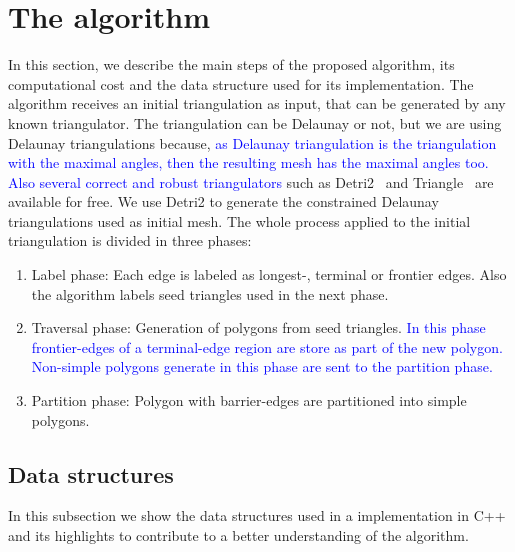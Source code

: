 \documentclass[pdflatex,sn-mathphys]{sn-jnl}%
\theoremstyle{thmstyleone}%
\theoremstyle{thmstyletwo}%
\theoremstyle{thmstylethree}%
\begin{document}
\section{The algorithm}
\label{sec:the_algorithm}


In this section, we describe  the main steps of the proposed algorithm, its computational cost  and the data structure used for its implementation.
The algorithm receives an initial triangulation as input, that can be generated by any known triangulator. The triangulation can be Delaunay or not, but we are using Delaunay triangulations because, \textcolor{blue}{ as Delaunay triangulation is the triangulation with the maximal angles, then the resulting mesh has the maximal angles too. Also several correct and robust triangulators} such as Detri2~\cite{Detri2} and Triangle~\cite{Shewchuktriangle} are available for free.  We use Detri2 \cite{Detri2} to generate the constrained Delaunay triangulations used as initial mesh. The whole process applied to the initial triangulation is divided in three phases:


\begin{enumerate}[label=\roman*)]
    \item Label phase: Each edge is labeled as  longest-, terminal or frontier edges. Also the algorithm labels seed triangles used in the next phase.
    \item Traversal phase: Generation of polygons from seed triangles. \textcolor{blue}{In this phase frontier-edges of a terminal-edge region are store as part of the new polygon. Non-simple polygons generate in this phase are sent to the partition phase.}
    \item Partition phase: Polygon with barrier-edges are partitioned into simple polygons.
\end{enumerate}


\subsection{Data structures}
\label{sec:datastructrue}
In this subsection we show the data structures used in a implementation in C++ and its highlights to  contribute to a better understanding of the algorithm.  %
\end{document}
